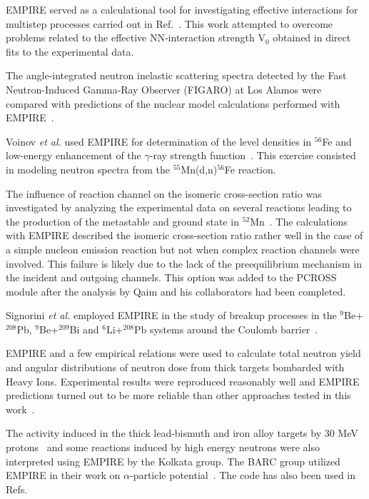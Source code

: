 \documentclass[twocolumn,amsmath,amssymb,10pt,groupedaddress,a4paper]{revtex4}
\begin{document}
EMPIRE served as a calculational tool for investigating effective interactions for multistep processes carried out in Ref.~\cite{avrigeanu2001eim}. This work attempted to overcome problems related to the effective NN-interaction strength V$_0$ obtained in direct fits to the experimental data.


The angle-integrated neutron inelastic scattering spectra detected by the Fast Neutron-Induced Gamma-Ray Observer (FIGARO) at Los Alamos were compared with predictions of the nuclear model calculations performed with EMPIRE~\cite{rochman2004nir}.

Voinov \textit{et al.} used EMPIRE for determination of the level densities in $^{56}$Fe
and low-energy enhancement of the $\gamma$-ray strength function~\cite{Voinov:06}.
This exercise consisted in modeling neutron spectra from the $^{55}$Mn(d,n)$^{56}$Fe reaction.

The influence of reaction channel on the isomeric cross-section ratio was investigated by analyzing the experimental data on several reactions leading to the production of the metastable and ground state in $^{52}$Mn~\cite{Qaim:05}. The calculations with EMPIRE described the isomeric cross-section ratio rather well in the
case of a simple nucleon emission reaction but not when
complex reaction channels were involved. This failure is likely due to the lack of the preequilibrium mechanism in the incident and outgoing channels. This option was added to the PCROSS module after the analysis by Qaim and his collaborators had been completed.

Signorini \textit{et al.} employed EMPIRE in the study of breakup processes in the $^9$Be+$^{208}$Pb, $^9$Be+$^{209}$Bi and $^6$Li+$^{208}$Pb systems around the Coulomb barrier~\cite{signorini2004bps}.

EMPIRE and a few empirical relations were used to calculate total neutron yield and angular distributions of neutron dose from thick targets bombarded with Heavy Ions. Experimental results were reproduced reasonably well and EMPIRE predictions turned out to be more reliable than other approaches tested in this work~\cite{Nandy:07}.

The  activity induced in the thick lead-bismuth and iron alloy targets by 30 MeV protons~\cite{Nandy:07a} and some reactions induced by high energy neutrons were also interpreted using EMPIRE by the Kolkata group. The BARC group utilized EMPIRE in their work on $\alpha$-particle potential~\cite{Kumar:06}. The code  has also been used in Refs.~\cite{Said:06, Elmaghraby:06, Pandey:07}
\end{document}
